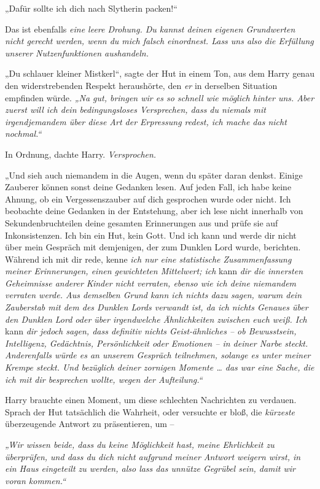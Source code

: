 {„Dafür sollte ich dich nach Slytherin packen!“

Das ist ebenfalls \emph{eine leere Drohung. Du kannst deinen eigenen Grundwerten nicht gerecht werden, wenn du mich falsch einordnest. Lass uns also die Erfüllung unserer Nutzenfunktionen aushandeln.}

„Du schlauer kleiner Mistkerl“, sagte der Hut in einem Ton, aus dem Harry genau den widerstrebenden Respekt heraushörte, den \emph{er} in derselben Situation empfinden würde. \emph{„Na gut, bringen wir es so schnell wie möglich hinter uns. Aber zuerst will ich dein bedingungsloses Versprechen, dass du niemals mit irgendjemandem über diese Art der Erpressung redest, ich mache das nicht nochmal.“}

In Ordnung, dachte Harry. \emph{Versprochen.}

„Und sieh auch niemandem in die Augen, wenn du später daran denkst. Einige Zauberer können sonst deine Gedanken lesen. Auf jeden Fall, ich habe keine Ahnung, ob ein Vergessenszauber auf dich gesprochen wurde oder nicht. Ich beobachte deine Gedanken in der Entstehung, aber ich lese nicht innerhalb von Sekundenbruchteilen deine gesamten Erinnerungen aus und prüfe sie auf Inkonsistenzen. Ich bin ein Hut, kein Gott. Und ich kann und werde dir nicht über mein Gespräch mit demjenigen, der zum Dunklen Lord wurde, berichten. Während ich mit dir rede, kenne \emph{ich nur eine statistische Zusammenfassung meiner Erinnerungen, einen gewichteten Mittelwert; ich} kann \emph{dir die innersten Geheimnisse anderer Kinder nicht verraten, ebenso wie ich deine niemandem verraten werde. Aus demselben Grund kann ich nichts dazu sagen, warum dein Zauberstab mit dem des Dunklen Lords verwandt ist, da ich nichts Genaues über den Dunklen Lord oder über irgendwelche Ähnlichkeiten zwischen euch weiß. Ich} kann \emph{dir jedoch sagen, dass definitiv nichts Geist-ähnliches -- ob Bewusstsein, Intelligenz, Gedächtnis, Persönlichkeit oder Emotionen -- in deiner Narbe steckt. Anderenfalls würde es an unserem Gespräch teilnehmen, solange es unter meiner Krempe steckt. Und bezüglich deiner zornigen Momente … das war eine Sache, die ich mit dir besprechen wollte, wegen der Aufteilung.“}

Harry brauchte einen Moment, um diese schlechten Nachrichten zu verdauen. Sprach der Hut tatsächlich die Wahrheit, oder versuchte er bloß, die \emph{kürzeste} überzeugende Antwort zu präsentieren, um --

\emph{„Wir wissen beide, dass du keine Möglichkeit hast, meine Ehrlichkeit zu überprüfen, und dass du dich nicht aufgrund meiner Antwort weigern wirst, in ein Haus eingeteilt zu werden, also lass das unnütze Gegrübel sein, damit wir voran kommen.“}

}
